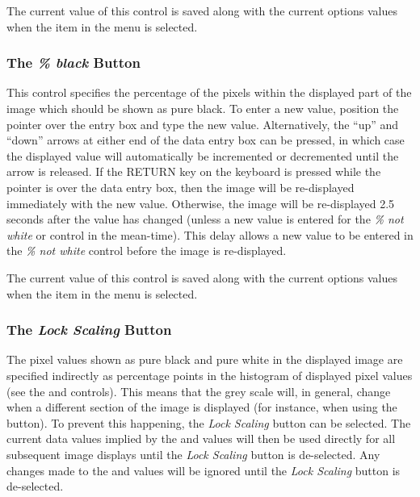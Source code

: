 The current value of this control is saved along with the current options
values when the  item in
the  menu is selected.

\subsubsection {The {\em \% black} Button}
This control specifies the percentage of the pixels within the displayed
part of the image which should be shown as pure black. To enter a new value,
position the pointer over the entry box and type the new value.
Alternatively, the ``up'' and ``down'' arrows at either end of the data
entry box can be pressed, in which case the displayed value will
automatically be incremented or decremented until the arrow is released.
If the RETURN key on the keyboard is pressed while the pointer is
over the data entry box, then the image will be re-displayed immediately
with the new value. Otherwise, the image will be re-displayed 2.5 seconds
after the value has changed (unless a new value is entered for the {\em
\% not white} or  control in
the mean-time). This delay allows a new value to be entered in the {\em
\% not white} control before the image is re-displayed.

The current value of this control is saved along with the current options
values when the  item in
the  menu is selected.

\subsubsection {The {\em Lock Scaling} Button}
The pixel values shown as pure black and pure white in the displayed
image are specified indirectly as percentage points in the histogram of
displayed pixel values (see the  and 
controls). This means that the grey scale will, in general, change when a
different section of the image is displayed (for instance, when using the
 button). To prevent this happening, the
{\em Lock Scaling} button can be selected. The current data values
implied by the  and
 values will then be used
directly for all subsequent image displays until the {\em Lock Scaling}
button is de-selected. Any changes made to the  and 
values will be ignored until the {\em Lock Scaling} button is
de-selected.

